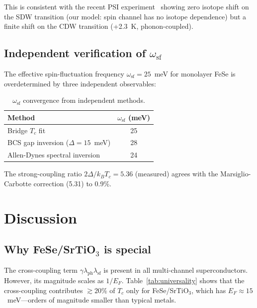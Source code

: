 \documentclass[twocolumn,showpacs,preprintnumbers,amsmath,amssymb,prb]{revtex4-2}
\begin{document}
This is consistent with the recent PSI experiment~\cite{PSI2026} showing zero isotope shift on the SDW transition (our model: spin channel has no isotope dependence) but a finite shift on the CDW transition (+2.3~K, phonon-coupled).

\subsection{Independent verification of $\omega_{\mathrm{sf}}$}

The effective spin-fluctuation frequency $\omega_{\mathrm{sf}} = 25$~meV for monolayer FeSe is overdetermined by three independent observables:

\begin{table}[h]
\caption{$\omega_{\mathrm{sf}}$ convergence from independent methods.}
\begin{ruledtabular}
\begin{tabular}{lc}
Method & $\omega_{\mathrm{sf}}$ (meV) \\
\hline
Bridge $T_c$ fit & 25 \\
BCS gap inversion ($\Delta = 15$~meV) & 28 \\
Allen-Dynes spectral inversion & 24 \\
\end{tabular}
\end{ruledtabular}
\label{tab:omega_convergence}
\end{table}

The strong-coupling ratio $2\Delta/k_B T_c = 5.36$ (measured) agrees with the Marsiglio-Carbotte correction (5.31) to 0.9\%.

\section{Discussion}

\subsection{Why FeSe/SrTiO$_3$ is special}

The cross-coupling term $\gamma \lambda_{\mathrm{ph}} \lambda_{\mathrm{sf}}$ is present in all multi-channel superconductors.
However, its magnitude scales as $1/E_F$.
Table~\ref{tab:universality} shows that the cross-coupling contributes $\gtrsim 20\%$ of $T_c$ only for FeSe/SrTiO$_3$, which has $E_F \approx 15$~meV---orders of magnitude smaller than typical metals.
\end{document}
